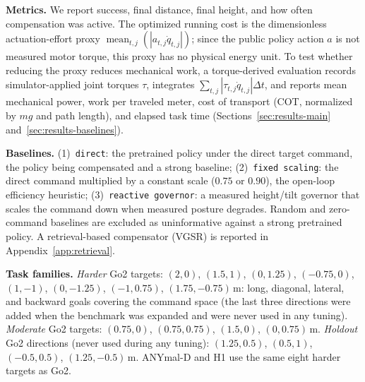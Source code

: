 \documentclass{article}
\begin{document}
\textbf{Metrics.}
We report success, final distance, final height, and how often compensation was
active. The optimized running cost is the dimensionless actuation-effort proxy
$\operatorname{mean}_{t,j}(|a_{t,j}\dot q_{t,j}|)$; since the public policy action
$a$ is not measured motor torque, this proxy has no physical energy unit. To test
whether reducing the proxy reduces mechanical work, a torque-derived evaluation
records simulator-applied joint torques $\tau$, integrates
$\sum_{t,j}|\tau_{t,j}\dot q_{t,j}|\Delta t$, and reports mean mechanical power,
work per traveled meter, cost of transport (COT, normalized by $mg$ and path
length), and elapsed task time (Sections~\ref{sec:results-main}
and~\ref{sec:results-baselines}).

\textbf{Baselines.}
(1)~\texttt{direct}: the pretrained policy under the direct target command, the
policy being compensated and a strong baseline;
(2)~\texttt{fixed scaling}: the direct command multiplied by a constant scale
($0.75$ or $0.90$), the open-loop efficiency heuristic;
(3)~\texttt{reactive governor}: a measured height/tilt governor that scales the
command down when measured posture degrades.
Random and zero-command baselines are excluded as uninformative against a strong
pretrained policy. A retrieval-based compensator (VGSR) is reported in
Appendix~\ref{app:retrieval}.

\textbf{Task families.}
\emph{Harder} Go2 targets: $(2,0)$, $(1.5,1)$, $(0,1.25)$, $(-0.75,0)$, $(1,-1)$,
$(0,-1.25)$, $(-1,0.75)$, $(1.75,-0.75)$\,m: long, diagonal, lateral, and backward
goals covering the command space (the last three directions were added when the
benchmark was expanded and were never used in any tuning).
\emph{Moderate} Go2 targets: $(0.75,0)$, $(0.75,0.75)$, $(1.5,0)$, $(0,0.75)$\,m.
\emph{Holdout} Go2 directions (never used during any tuning): $(1.25,0.5)$,
$(0.5,1)$, $(-0.5,0.5)$, $(1.25,-0.5)$\,m.
ANYmal-D and H1 use the same eight harder targets as Go2.
\end{document}
